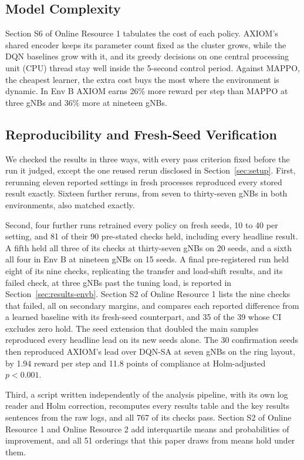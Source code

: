 \documentclass[pdflatex,sn-basic,Numbered]{sn-jnl}
\begin{document}
\subsection{Model Complexity}

Section S6 of Online Resource 1 tabulates the cost of each policy. AXIOM's shared encoder keeps its parameter count fixed as the cluster grows, while the DQN baselines grow with it, and its greedy decisions on one central processing unit (CPU) thread stay well inside the 5-second control period. Against MAPPO, the cheapest learner, the extra cost buys the most where the environment is dynamic. In Env B AXIOM earns 26\% more reward per step than MAPPO at three gNBs and 36\% more at nineteen gNBs.

\subsection{Reproducibility and Fresh-Seed Verification}
\label{sec:results-verify}
We checked the results in three ways, with every pass criterion fixed before the run it judged, except the one reused rerun disclosed in Section~\ref{sec:setup}. First, rerunning eleven reported settings in fresh processes reproduced every stored result exactly. Sixteen further reruns, from seven to thirty-seven gNBs in both environments, also matched exactly.

Second, four further runs retrained every policy on fresh seeds, 10 to 40 per setting, and 81 of their 90 pre-stated checks held, including every headline result. A fifth held all three of its checks at thirty-seven gNBs on 20 seeds, and a sixth all four in Env B at nineteen gNBs on 15 seeds. A final pre-registered run held eight of its nine checks, replicating the transfer and load-shift results, and its failed check, at three gNBs past the tuning load, is reported in Section~\ref{sec:results-envb}. Section S2 of Online Resource 1 lists the nine checks that failed, all on secondary margins, and compares each reported difference from a learned baseline with its fresh-seed counterpart, and 35 of the 39 whose CI excludes zero hold. The seed extension that doubled the main samples reproduced every headline lead on its new seeds alone. The 30 confirmation seeds then reproduced AXIOM's lead over DQN-SA at seven gNBs on the ring layout, by 1.94 reward per step and 11.8 points of compliance at Holm-adjusted $p<0.001$.

Third, a script written independently of the analysis pipeline, with its own log reader and Holm correction, recomputes every results table and the key results sentences from the raw logs, and all 767 of its checks pass. Section S2 of Online Resource 1 and Online Resource 2 add interquartile means and probabilities of improvement, and all 51 orderings that this paper draws from means hold under them.
\end{document}
